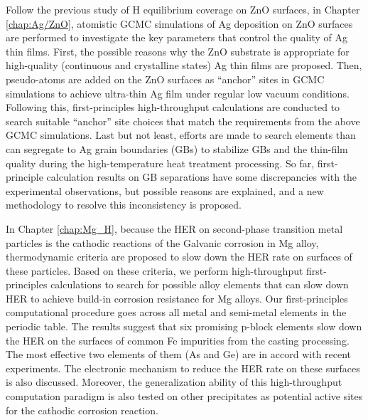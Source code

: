 Follow the previous study of H equilibrium coverage on ZnO surfaces, in Chapter \ref{chap:Ag/ZnO}, atomistic \acf{GCMC} simulations of Ag deposition on ZnO surfaces are performed to investigate the key parameters that control the quality of Ag thin films. First, the possible reasons why the ZnO substrate is appropriate for high-quality (continuous and crystalline states) Ag thin films are proposed. Then, pseudo-atoms are added on the ZnO surfaces as ``anchor'' sites in GCMC simulations to achieve ultra-thin Ag film under regular low vacuum conditions. Following this, first-principles high-throughput calculations are conducted to search suitable ``anchor'' site choices that match the requirements from the above GCMC simulations. Last but not least, efforts are made to search elements than can segregate to Ag grain boundaries (GBs) to stabilize GBs and the thin-film quality during the high-temperature heat treatment processing. So far, first-principle calculation results on GB separations have some discrepancies with the experimental observations, but possible reasons are explained, and a new methodology to resolve this inconsistency is proposed.

In Chapter \ref{chap:Mg_H}, because the \acf{HER} on second-phase transition metal particles is the cathodic reactions of the Galvanic corrosion in Mg alloy, thermodynamic criteria are proposed to slow down the HER rate on surfaces of these particles. Based on these criteria, we perform high-throughput first-principles calculations to search for possible alloy elements that can slow down HER to achieve build-in corrosion resistance for Mg alloys.  Our first-principles computational procedure goes across all metal and semi-metal elements in the periodic table. The results suggest that six promising p-block elements slow down the HER on the surfaces of common Fe impurities from the casting processing. The most effective two elements of them (As and Ge) are in accord with recent experiments. The electronic mechanism to reduce the HER rate on these surfaces is also discussed. Moreover, the generalization ability of this high-throughput computation paradigm is also tested on other precipitates as potential active sites for the cathodic corrosion reaction. 


